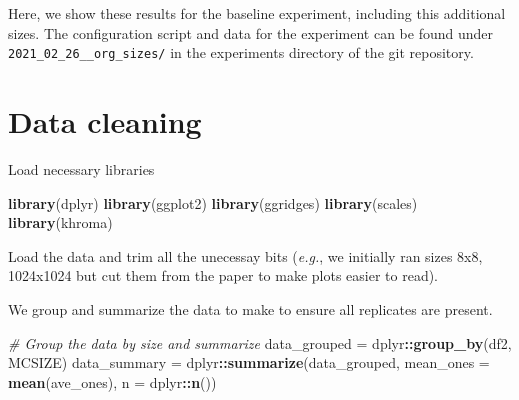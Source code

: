 \documentclass[]{book}
\newenvironment{Shaded}{\begin{snugshade}}{\end{snugshade}}
\newcommand{\CommentTok}[1]{\textcolor[rgb]{0.56,0.35,0.01}{\textit{#1}}}
\newcommand{\DataTypeTok}[1]{\textcolor[rgb]{0.13,0.29,0.53}{#1}}
\newcommand{\DecValTok}[1]{\textcolor[rgb]{0.00,0.00,0.81}{#1}}
\newcommand{\KeywordTok}[1]{\textcolor[rgb]{0.13,0.29,0.53}{\textbf{#1}}}
\newcommand{\NormalTok}[1]{#1}
\newcommand{\OperatorTok}[1]{\textcolor[rgb]{0.81,0.36,0.00}{\textbf{#1}}}
\newcommand{\StringTok}[1]{\textcolor[rgb]{0.31,0.60,0.02}{#1}}
\begin{document}
Here, we show these results for the baseline experiment, including this additional sizes.
The configuration script and data for the experiment can be found under \texttt{2021\_02\_26\_\_org\_sizes/} in the experiments directory of the git repository.

\hypertarget{data-cleaning}{%
\section{Data cleaning}\label{data-cleaning}}

Load necessary libraries

\begin{Shaded}
\begin{Highlighting}[]
\KeywordTok{library}\NormalTok{(dplyr)}
\KeywordTok{library}\NormalTok{(ggplot2)}
\KeywordTok{library}\NormalTok{(ggridges)}
\KeywordTok{library}\NormalTok{(scales)}
\KeywordTok{library}\NormalTok{(khroma)}
\end{Highlighting}
\end{Shaded}

Load the data and trim all the unecessay bits (\emph{e.g.}, we initially ran sizes 8x8, 1024x1024 but cut them from the paper to make plots easier to read).

\begin{Shaded}
\end{Shaded}

We group and summarize the data to make to ensure all replicates are present.

\begin{Shaded}
\begin{Highlighting}[]
\CommentTok{# Group the data by size and summarize}
\NormalTok{data_grouped =}\StringTok{ }\NormalTok{dplyr}\OperatorTok{::}\KeywordTok{group_by}\NormalTok{(df2, MCSIZE)}
\NormalTok{data_summary =}\StringTok{ }\NormalTok{dplyr}\OperatorTok{::}\KeywordTok{summarize}\NormalTok{(data_grouped, }\DataTypeTok{mean_ones =} \KeywordTok{mean}\NormalTok{(ave_ones), }\DataTypeTok{n =}\NormalTok{ dplyr}\OperatorTok{::}\KeywordTok{n}\NormalTok{())}
\end{Highlighting}
\end{Shaded}
\end{document}
